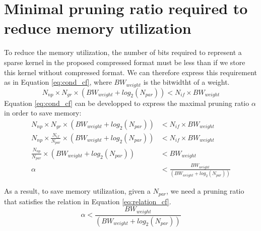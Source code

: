 \chapter{Minimal pruning ratio required to reduce memory utilization} \label{appendix:cf}
%
To reduce the memory utilization, the number of bits required to represent a sparse kernel in the proposed compressed format must be less than if we store this kernel without compressed format. We can therefore express this requirement as in Equation \eqref{eq:cond_cf}, where $BW_{weight}$ is the bitwidtht of a weight.
\begin{equation}
    N_{np} \times N_{gr} \times (BW_{weight} + log_2(N_{par})) < N_{if} \times BW_{weight}
    \label{eq:cond_cf}
\end{equation}
Equation \eqref{eq:cond_cf} can be developped to express the maximal pruning ratio $\alpha$ in order to save memory:
\begin{align*}
    N_{np} \times N_{gr} \times (BW_{weight} + log_2(N_{par})) &< N_{if} \times BW_{weight} \\
    N_{np} \times \frac{N_{if}}{N_{par}} \times (BW_{weight} + log_2(N_{par})) &< N_{if} \times BW_{weight} \\
    \frac{N_{np}}{N_{par}} \times (BW_{weight} + log_2(N_{par})) &< BW_{weight} \\
    \alpha &< \frac{BW_{weight}}{(BW_{weight} + log_2(N_{par}))}
\end{align*}

As a result, to save memory utilization, given a $N_{par}$, we need a pruning ratio that satisfies the relation in Equation \ref{eq:relation_cf}.
\begin{equation}
    \alpha < \frac{BW_{weight}}{(BW_{weight} + log_2(N_{par}))}
    \label{eq:relation_cf}
\end{equation} 
\newpage